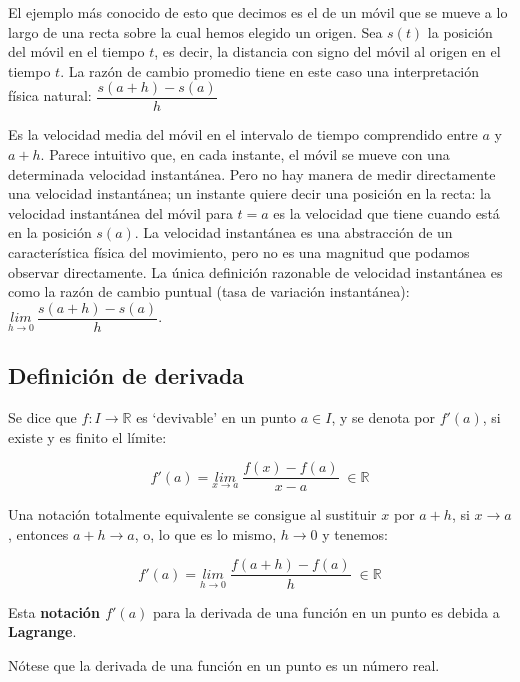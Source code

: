	  El ejemplo más conocido de esto que decimos es el de un móvil que se mueve a lo largo de una recta sobre la cual hemos elegido un origen. Sea $s(t)$ la posición del móvil en el tiempo $t$, es decir, la distancia con signo del móvil al origen en el tiempo $t$. La razón de cambio promedio tiene en este caso una interpretación física natural: $\dfrac{s(a+h)-s(a)}{h}$ 
	  
	  Es la velocidad media del móvil en el intervalo de tiempo comprendido entre $a$ y $a + h$. Parece intuitivo que, en cada instante, el móvil se mueve con una determinada velocidad instantánea. Pero no hay manera de medir directamente una velocidad instantánea; un instante quiere decir una posición en la recta: la velocidad instantánea del móvil para $t = a$ es la velocidad que tiene cuando está en la posición $s(a)$. La velocidad instantánea es una abstracción de un característica física del movimiento, pero no es una magnitud que podamos observar directamente. La única definición razonable de velocidad instantánea es como la razón de cambio puntual (tasa de variación instantánea): $\underset{h\to 0}{lim}\:{\dfrac {s(a+h)-s(a)}{h}}$.
	  
	  \subsection{Definición de derivada}
	  
	  \begin{defi}
	  Se dice que $f:I\to \mathbb R$ es `devivable' en un punto $a\in I$, y se denota por $f'(a)$, si existe y es finito el límite:	
	  
	  \begin{equation}
	  	\boxed{	\quad f'(a)=\underset {x\to a}{lim}\;{\dfrac{f(x)-f(a)}{x-a}}\; \in \mathbb R \quad}
	  \end{equation}
	  
	  
	  Una notación totalmente equivalente se consigue al sustituir $x$ por $a+h$, si $x\to a$, entonces $a+h \to a$, o, lo que es lo mismo, $h\to 0$ y tenemos:
	  
	  \begin{equation}
	  		\boxed{\quad f'(a)=\underset {h\to 0}{lim}\;{\dfrac{f(a+h)-f(a)}{h}} \; \in \mathbb R \quad }
	  \end{equation}
	  
	  Esta \textbf{notación $f'(a)$} para la derivada de una función en un punto es debida a \textbf{Lagrange}. 
	  
	  Nótese que la derivada de una función en un punto es un número real.
	  \end{defi}
	  
